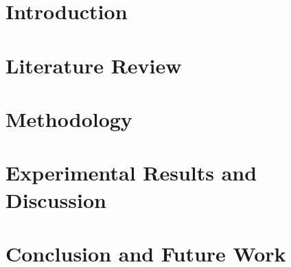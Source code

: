 \documentclass[12pt, a4paper]{report}
\begin{document}

\pagebreak



\pagebreak


\pagebreak



\pagebreak

\renewcommand{\contentsname}{Table of Contents}
\tableofcontents

\clearpage 
\setcounter{figure}{0}
\listoffigures

\clearpage 
{}
\listoftables
 

\clearpage




\chapter{Introduction}\label{chapter:chapter1}
\setcounter{page}{0}


\chapter{Literature Review}


\chapter{Methodology}


\chapter{Experimental Results and Discussion}


\chapter{Conclusion and Future Work}



\pagebreak
{}
{}
\nocite{*}
\printbibliography
\pagebreak
{}
\end{document}
